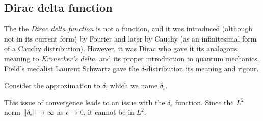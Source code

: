 \documentclass[letterpaper,12pt]{article}
\begin{document}
\subsection{Dirac delta function}

The the \emph{Dirac delta function} is not a function, and it was introduced (although not in its current form) by Fourier and later by Cauchy (as an infinitesimal form of a Cauchy distribution). However, it was Dirac who gave it its analogous meaning to \emph{Kronecker's delta}, and its proper introduction to quantum mechanics. Field's medalist Laurent Schwartz gave the $\delta$-distribution its meaning and rigour. 

Consider the approximation to $\delta$, which we name $\delta_\epsilon$. 

This issue of convergence leads to an issue with the $\delta_\epsilon$ function. Since the $L^2$ norm $\norm{\delta_\epsilon}\rightarrow\infty$ as $\epsilon\rightarrow 0$, it cannot be in $L^2$.

\end{document}

